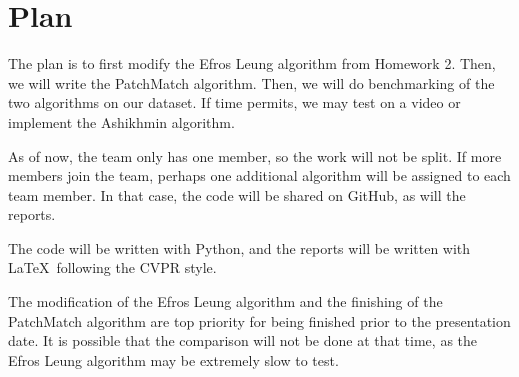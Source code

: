 \section{Plan}

The plan is to first modify the Efros Leung algorithm from Homework 2. Then, we will write the PatchMatch algorithm. Then, we will do benchmarking of the two algorithms on our dataset. If time permits, we may test on a video or implement the Ashikhmin algorithm.

As of now, the team only has one member, so the work will not be split. If more members join the team, perhaps one additional algorithm will be assigned to each team member. In that case, the code will be shared on GitHub, as will the reports.

The code will be written with Python, and the reports will be written with \LaTeX~following the CVPR style.

The modification of the Efros Leung algorithm and the finishing of the PatchMatch algorithm are top priority for being finished prior to the presentation date. It is possible that the comparison will not be done at that time, as the Efros Leung algorithm may be extremely slow to test.